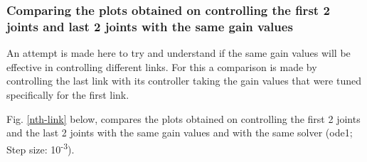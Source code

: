 \documentclass[a4paper,12pt]{report}
\begin{document}
\subsubsection{Comparing the plots obtained on controlling the first 2 joints and last 2 joints with the same gain values}

An attempt is made here to try and understand if the same gain values will be effective in controlling different links. For this a comparison is made by controlling the last link with its controller taking the gain values that were tuned specifically for the first link.

Fig. \ref{nth-link} below, compares the plots obtained on controlling the first 2 joints and the last 2 joints with the same gain values and with the same solver (ode1; Step size: 10\textsuperscript{-3}).
\end{document}
